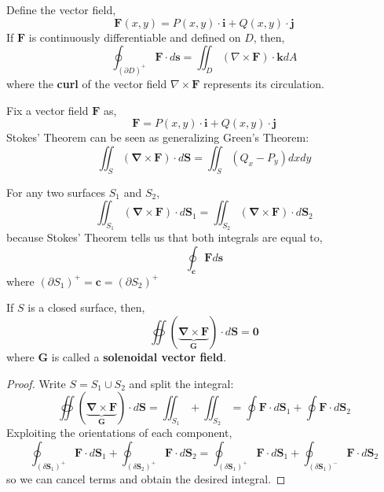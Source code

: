 \hfill

\begin{thm}
	Define the vector field,
	\[\mathbf{F}(x,y) = P(x,y) \cdot \mathbf{i} + Q(x,y) \cdot \mathbf{j}\]
	If $\mathbf{F}$ is continuously differentiable and defined on $D$, then,
	\[\oint_{{(\partial D)}^+} \mathbf{F} \cdot d \mathbf{s}=\iint_D(\nabla \times \mathbf{F}) \cdot \mathbf{k} d A\]
	where the \textbf{curl} of the vector field $\nabla \times \mathbf{F}$ represents its circulation.
\end{thm}

\begin{rmk}
	Fix a vector field $\mathbf{F}$ as,
	\[\mathbf{F}=P(x, y)\cdot\mathbf{i}+Q(x, y)\cdot\mathbf{j}\]
	Stokes' Theorem can be seen as generalizing Green's Theorem:
	\[\iint_S(\mathbf{\nabla} \times \mathbf{F}) \cdot d \mathbf{S}=\iint_S\left(Q_x-P_y\right) d x d y\]
\end{rmk}

\begin{rmk}
	For any two surfaces $S_1$ and $S_2$,
	\[\iint_{S_1}(\mathbf{\nabla} \times \mathbf{F}) \cdot d \mathbf{S}_1=\iint_{S_2}(\mathbf{\nabla} \times \mathbf{F}) \cdot d \mathbf{S}_2\]
	because Stokes' Theorem tells us that both integrals are equal to,
	\[\oint_{\mathbf{c}} \mathbf{F} d \mathbf{s}\]
	where $\left(\partial S_1\right)^{+}=\mathbf{c}=\left(\partial S_2\right)^{+}$
\end{rmk}

\begin{prop}
	If $S$ is a closed surface, then,
	\[\oiint(\underbrace{\mathbf{\nabla} \times \mathbf{F}}_{\mathbf{G}}) \cdot d \mathbf{S}=\mathbf{0}\]
	where $\mathbf{G}$ is called a \textbf{solenoidal vector field}.
\end{prop}

\begin{proof}
	Write $S = S_1 \cup S_2$ and split the integral:
	\[\oiint(\underbrace{\mathbf{\nabla} \times \mathbf{F}}_{\mathbf{G}}) \cdot d \mathbf{S}= \iint_{S_1} + \iint_{S_2} = \oint \mathbf{F} \cdot d \mathbf{S}_1+\oint \mathbf{F} \cdot d \mathbf{S}_2\]
	Exploiting the orientations of each component,
	\[\oint_{(\delta \mathbf{S}_1)^+} \mathbf{F} \cdot d \mathbf{S}_1+\oint_{(\delta \mathbf{S}_2)^+} \mathbf{F} \cdot d \mathbf{S}_2 = \oint_{(\delta \mathbf{S}_1)^+} \mathbf{F} \cdot d \mathbf{S}_1+ \oint_{(\delta \mathbf{S}_1)^-} \mathbf{F} \cdot d \mathbf{S}_2\]
	so we can cancel terms and obtain the desired integral.
\end{proof}

